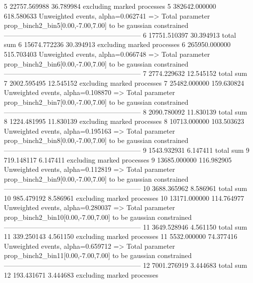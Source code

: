 5          22757.569988    36.789984       excluding marked processes    
5          382642.000000   618.580633      Unweighted events, alpha=0.062741
  => Total parameter prop_binch2_bin5[0.00,-7.00,7.00] to be gaussian constrained
------------------------------------------------------------
6          17751.510397    30.394913       total sum                     
6          15674.772236    30.394913       excluding marked processes    
6          265950.000000   515.703403      Unweighted events, alpha=0.066748
  => Total parameter prop_binch2_bin6[0.00,-7.00,7.00] to be gaussian constrained
------------------------------------------------------------
7          2774.229632     12.545152       total sum                     
7          2002.595495     12.545152       excluding marked processes    
7          25482.000000    159.630824      Unweighted events, alpha=0.108870
  => Total parameter prop_binch2_bin7[0.00,-7.00,7.00] to be gaussian constrained
------------------------------------------------------------
8          2090.780092     11.830139       total sum                     
8          1224.481995     11.830139       excluding marked processes    
8          10713.000000    103.503623      Unweighted events, alpha=0.195163
  => Total parameter prop_binch2_bin8[0.00,-7.00,7.00] to be gaussian constrained
------------------------------------------------------------
9          1543.932931     6.147411        total sum                     
9          719.148117      6.147411        excluding marked processes    
9          13685.000000    116.982905      Unweighted events, alpha=0.112819
  => Total parameter prop_binch2_bin9[0.00,-7.00,7.00] to be gaussian constrained
------------------------------------------------------------
10         3688.365962     8.586961        total sum                     
10         985.479192      8.586961        excluding marked processes    
10         13171.000000    114.764977      Unweighted events, alpha=0.280037
  => Total parameter prop_binch2_bin10[0.00,-7.00,7.00] to be gaussian constrained
------------------------------------------------------------
11         3649.528946     4.561150        total sum                     
11         339.250143      4.561150        excluding marked processes    
11         5532.000000     74.377416       Unweighted events, alpha=0.659712
  => Total parameter prop_binch2_bin11[0.00,-7.00,7.00] to be gaussian constrained
------------------------------------------------------------
12         7001.276919     3.444683        total sum                     
12         193.431671      3.444683        excluding marked processes    
